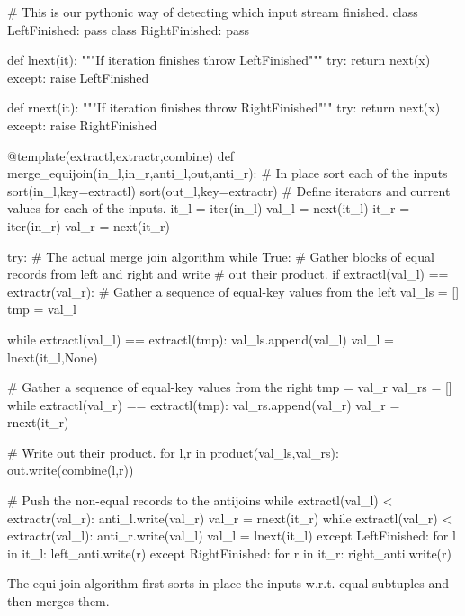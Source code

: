 \begin{code}
\begin{pycode}
# This is our pythonic way of detecting which input stream finished.
class LeftFinished:
    pass
class RightFinished:
    pass


def lnext(it):
    """If iteration finishes throw LeftFinished"""
    try:
        return next(x)
    except:
        raise LeftFinished

def rnext(it):
    """If iteration finishes throw RightFinished"""
    try:
        return next(x)
    except:
        raise RightFinished

@template(extractl,extractr,combine)
def merge_equijoin(in_l,in_r,anti_l,out,anti_r):
    # In place sort each of the inputs
    sort(in_l,key=extractl)
    sort(out_l,key=extractr)
    # Define iterators and current values for each of the inputs.
    it_l = iter(in_l)
    val_l = next(it_l)
    it_r = iter(in_r)
    val_r = next(it_r)

    try:
        # The actual merge join algorithm
        while True:
            # Gather blocks of equal records from left and right and write
            # out their product.
            if extractl(val_l) == extractr(val_r):
                # Gather a sequence of equal-key values from the left
                val_ls = []
                tmp = val_l

                while extractl(val_l) == extractl(tmp):
                    val_ls.append(val_l)
                    val_l = lnext(it_l,None)

                # Gather a sequence of equal-key values from the right
                tmp = val_r
                val_rs = []
                while extractl(val_r) == extractl(tmp):
                    val_rs.append(val_r)
                    val_r = rnext(it_r)

                # Write out their product.
                for l,r in product(val_ls,val_rs):
                    out.write(combine(l,r))

            # Push the non-equal records to the antijoins
            while extractl(val_l) < extractr(val_r):
                anti_l.write(val_r)
                val_r = rnext(it_r)
            while extractl(val_r) < extractr(val_l):
                anti_r.write(val_l)
                val_l = lnext(it_l)
    except LeftFinished:
        for l in it_l:
            left_anti.write(r)
    except RightFinished:
        for r in it_r:
            right_anti.write(r)
\end{pycode}
\caption{\label{lst:join_algorithm}The equi-join algorithm first sorts
  in place the inputs w.r.t. equal subtuples and then merges
  them.}
\end{code}


